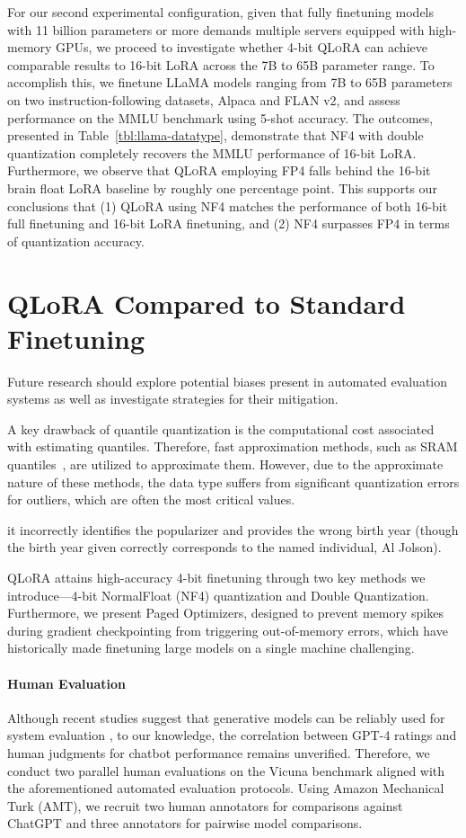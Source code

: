 For our second experimental configuration, given that fully finetuning models with 11 billion parameters or more demands multiple servers equipped with high-memory GPUs, we proceed to investigate whether 4-bit \textsc{QLoRA} can achieve comparable results to 16-bit LoRA across the 7B to 65B parameter range. To accomplish this, we finetune LLaMA models ranging from 7B to 65B parameters on two instruction-following datasets, Alpaca and FLAN v2, and assess performance on the MMLU benchmark using 5-shot accuracy. The outcomes, presented in Table~\ref{tbl:llama-datatype}, demonstrate that NF4 with double quantization completely recovers the MMLU performance of 16-bit LoRA. Furthermore, we observe that \textsc{QLoRA} employing FP4 falls behind the 16-bit brain float LoRA baseline by roughly one percentage point. This supports our conclusions that (1) \textsc{QLoRA} using NF4 matches the performance of both 16-bit full finetuning and 16-bit LoRA finetuning, and (2) NF4 surpasses FP4 in terms of quantization accuracy.

\section{QLoRA Compared to Standard Finetuning}
\label{sec:comp_to_std}

Future research should explore potential biases present in automated evaluation systems as well as investigate strategies for their mitigation.

A key drawback of quantile quantization is the computational cost associated with estimating quantiles. Therefore, fast approximation methods, such as SRAM quantiles~\citep{dettmers2022optimizers}, are utilized to approximate them. However, due to the approximate nature of these methods, the data type suffers from significant quantization errors for outliers, which are often the most critical values.

it incorrectly identifies the popularizer and provides the wrong birth year (though the birth year given correctly corresponds to the named individual, Al Jolson).

\textsc{QLoRA} attains high-accuracy 4-bit finetuning through two key methods we introduce—4-bit NormalFloat (NF4) quantization and Double Quantization. Furthermore, we present Paged Optimizers, designed to prevent memory spikes during gradient checkpointing from triggering out-of-memory errors, which have historically made finetuning large models on a single machine challenging.

\paragraph{Human Evaluation} Although recent studies suggest that generative models can be reliably used for system evaluation \citep{fu2023gptscore}, to our knowledge, the correlation between GPT-4 ratings and human judgments for chatbot performance remains unverified. Therefore, we conduct two parallel human evaluations on the Vicuna benchmark aligned with the aforementioned automated evaluation protocols. Using Amazon Mechanical Turk (AMT), we recruit two human annotators for comparisons against ChatGPT and three annotators for pairwise model comparisons.

